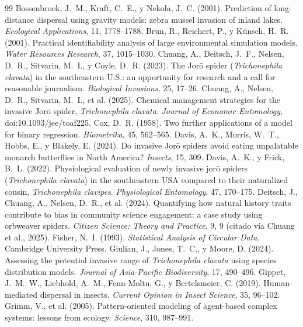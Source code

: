 \documentclass[11pt,letterpaper]{article}
\begin{document}
\begin{thebibliography}{99}\small
{} Bossenbroek, J.~M., Kraft, C.~E., y Nekola, J.~C. (2001). Prediction of long-distance dispersal using gravity models: zebra mussel invasion of inland lakes. \textit{Ecological Applications}, 11, 1778--1788.
 Brun, R., Reichert, P., y Künsch, H.~R. (2001). Practical identifiability analysis of large environmental simulation models. \textit{Water Resources Research}, 37, 1015--1030.
 Chuang, A., Deitsch, J.~F., Nelsen, D.~R., Sitvarin, M.~I., y Coyle, D.~R. (2023). The Jorō spider (\textit{Trichonephila clavata}) in the southeastern U.S.: an opportunity for research and a call for reasonable journalism. \textit{Biological Invasions}, 25, 17--26.
 Chuang, A., Nelsen, D.~R., Sitvarin, M.~I., et al. (2025). Chemical management strategies for the invasive Jorō spider, \textit{Trichonephila clavata}. \textit{Journal of Economic Entomology}, doi:10.1093/jee/toaf225.
 Cox, D.~R. (1958). Two further applications of a model for binary regression. \textit{Biometrika}, 45, 562--565.
 Davis, A.~K., Morris, W.~T., Hobbs, E., y Blakely, E. (2024). Do invasive Jorō spiders avoid eating unpalatable monarch butterflies in North America? \textit{Insects}, 15, 309.
 Davis, A.~K., y Frick, B.~L. (2022). Physiological evaluation of newly invasive jorō spiders (\textit{Trichonephila clavata}) in the southeastern USA compared to their naturalized cousin, \textit{Trichonephila clavipes}. \textit{Physiological Entomology}, 47, 170--175.
 Deitsch, J., Chuang, A., Nelsen, D.~R., et al. (2024). Quantifying how natural history traits contribute to bias in community science engagement: a case study using orbweaver spiders. \textit{Citizen Science: Theory and Practice}, 9, 9 (citado vía Chuang et al., 2025).
 Fisher, N.~I. (1993). \textit{Statistical Analysis of Circular Data}. Cambridge University Press.
 Giulian, J., Jones, T.~C., y Moore, D. (2024). Assessing the potential invasive range of \textit{Trichonephila clavata} using species distribution models. \textit{Journal of Asia-Pacific Biodiversity}, 17, 490--496.
 Gippet, J.~M.~W., Liebhold, A.~M., Fenn-Moltu, G., y Bertelsmeier, C. (2019). Human-mediated dispersal in insects. \textit{Current Opinion in Insect Science}, 35, 96--102.
 Grimm, V., et al. (2005). Pattern-oriented modeling of agent-based complex systems: lessons from ecology. \textit{Science}, 310, 987--991.

\end{thebibliography}
\end{document}
